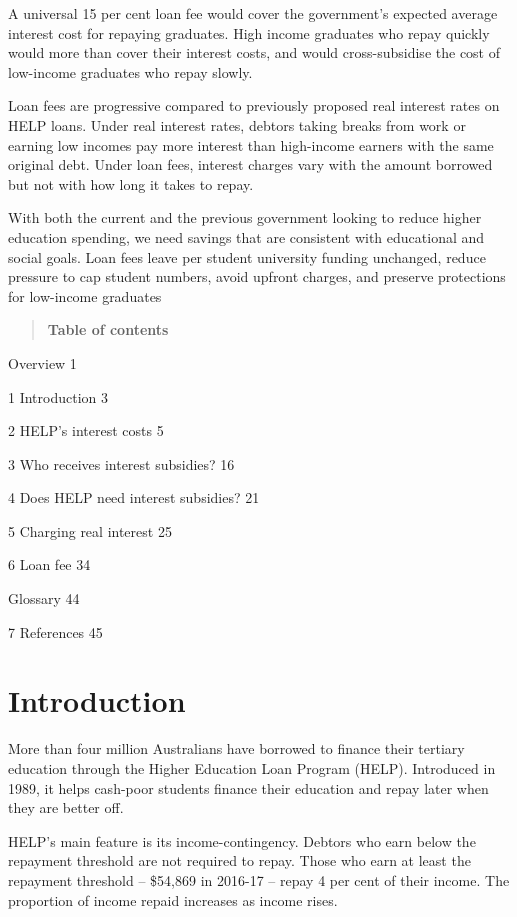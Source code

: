 \documentclass[]{book}
\begin{document}
A universal 15 per cent loan fee would cover the government's expected average interest cost for repaying graduates. High income graduates who repay quickly would more than cover their interest costs, and would cross-subsidise the cost of low-income graduates who repay slowly.

Loan fees are progressive compared to previously proposed real interest rates on HELP loans. Under real interest rates, debtors taking breaks from work or earning low incomes pay more interest than high-income earners with the same original debt. Under loan fees, interest charges vary with the amount borrowed but not with how long it takes to repay.

With both the current and the previous government looking to reduce higher education spending, we need savings that are consistent with educational and social goals. Loan fees leave per student university funding unchanged, reduce pressure to cap student numbers, avoid upfront charges, and preserve protections for low-income graduates

\begin{quote}
\textbf{Table of contents}
\end{quote}

Overview 1

1 Introduction 3

2 HELP's interest costs 5

3 Who receives interest subsidies? 16

4 Does HELP need interest subsidies? 21

5 Charging real interest 25

6 Loan fee 34

Glossary 44

7 References 45

\chapter{\texorpdfstring{\protect\hypertarget{_Toc341784480}{}{\protect\hypertarget{_Ref323558497}{}{}}Introduction}{Introduction}}\label{introduction}

More than four million Australians have borrowed to finance their tertiary education through the Higher Education Loan Program (HELP). Introduced in 1989, it helps cash-poor students finance their education and repay later when they are better off.

HELP's main feature is its income-contingency. Debtors who earn below the repayment threshold are not required to repay. Those who earn at least the repayment threshold -- \$54,869 in 2016-17 -- repay 4 per cent of their income. The proportion of income repaid increases as income rises.
\end{document}
